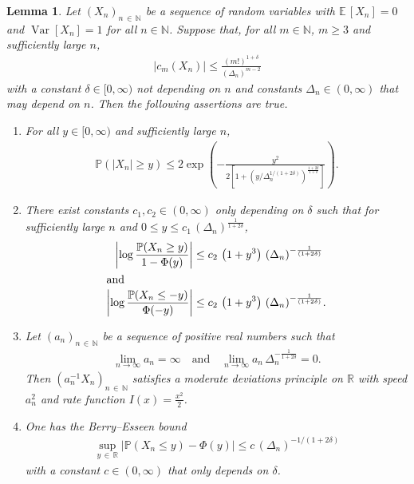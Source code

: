 \documentclass[10pt]{amsart}
\newtheorem{lemm}[theo]{Lemma}\newtheorem{prop}[theo]{Proposition}\newtheorem{coro}[theo]{Corollary}\newtheorem{conj}[theo]{Conjecture}
\theoremstyle{definition}\newtheorem{defi}[theo]{Definition}\newtheorem{rema}[theo]{Remark}\newtheorem{exam}[theo]{Example}\newtheorem{exem}[theo]{Example}\newtheorem{nota}[theo]{Notation}
\newcommand{\N}{\mathbb{N}}
\newcommand{\EE}{\mathbb{E}\,}
\newcommand{\PP}{\mathbb{P}}
\newcommand{\Var}{\mathop{\mathrm{Var}}\nolimits}
\newcommand*{\romanenumi}{\renewcommand*{\theenumi}{\roman{enumi}}}
\begin{document}
\begin{lemm}\label{lem:ConsequenceCumBounds}
Let $(X_n)_{n\,\in\,\N}$ be a sequence of random variables with $\EE[X_n] = 0$ and $\Var[X_n] = 1$ for all $n\in\N$. Suppose that, for all $m\in \N$, $m\ge 3$ and sufficiently large $n$,
\begin{align}\label{eq:CumBoundAbstract}
|c_m(X_n)| \leq \frac{(m!)^{1 + \delta}}{(\Delta_n)^{m-2}}
\end{align}
with a constant $\delta \in [0,\infty)$ not depending on $n$ and constants $\Delta_n \in (0,\infty)$ that may depend on $n$. Then the following assertions are true.
\begin{enumerate}\romanenumi
\item \label{list4.2.1}For all $y\in[0,\infty)$ and sufficiently large $n$,
\begin{align*}
\PP(|X_n| \geq y) \leq 2 \exp\left(-\frac{y^2}{2\left[1+\left(y/\Delta_n^{1/(1+2\delta)}\right)^\frac{1+2\delta}{1+\delta}\right]}\right).
\end{align*}
\item\label{list4.2.2} There exist constants $c_1,c_2 \in (0,\infty)$ only depending on $\delta$ such that for sufficiently large $n$ and $0\leq y\leq c_1\,(\Delta_n)^{\frac{1}{1 + 2\delta}}$,
\begin{align*}
\left|\log \frac{\PP(X_n \geq y)}{1 - \Phi(y)}\right| &\leq c_2\, \left(1 + y^3\right)\, (\Delta_n)^{-\frac{1}{(1+2\delta)}}\\ \intertext{and}
\left|\log \frac{\PP(X_n \leq -y)}{\Phi(-y)}\right| &\leq c_2\, \left(1 + y^3\right)\,(\Delta_n)^{-\frac{1}{(1+2\delta)}}.
\end{align*}
\item\label{list4.2.3} Let $(a_n)_{n\,\in\,\N}$ be a sequence of positive real numbers such that
\begin{align*}
\lim\limits_{n \rightarrow \infty} a_n = \infty \quad \text{and}\quad \lim\limits_{n \rightarrow \infty} a_n\, \Delta_n^{-\frac{1}{1 + 2\delta}} = 0.
\end{align*}
Then $(a_n^{-1} X_n)_{n\,\in\,\N}$ satisfies a moderate deviations principle on $\mathbb{R}$ with speed $a_n^2$ and rate function $I(x) = \frac{x^2}{2}$.
\item\label{list4.2.4} One has the Berry--Esseen bound
\begin{align*}
\sup\limits_{y\,\in\,\mathbb{R}} |\PP(X_n \leq y) - \Phi(y)| \leq c\, (\Delta_n)^{-1/(1+2\delta)}
\end{align*}
with a constant $c\in (0,\infty)$ that only depends on $\delta$.
\end{enumerate}
\end{lemm}
\end{document}

